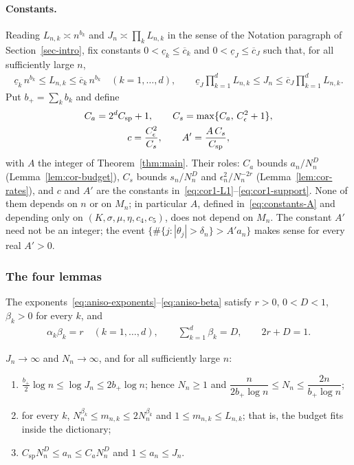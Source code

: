 \paragraph*{Constants.}
Reading $L_{n,k}\asymp n^{b_k}$ and $J_n\asymp\prod_kL_{n,k}$ in the sense of the Notation paragraph of Section~\ref{sec-intro}, fix constants $0<\underline c_k\leq\overline c_k$ and $0<\underline c_J\leq\overline c_J$ such that, for all sufficiently large $n$,
\begin{align}
\underline c_k\,n^{b_k}\leq L_{n,k}\leq\overline c_k\,n^{b_k}\quad(k=1,\ldots,d),
\qquad
\underline c_J\prod_{k=1}^dL_{n,k}\leq J_n\leq\overline c_J\prod_{k=1}^dL_{n,k}. \label{eq:cor-sizes}
\end{align}
Put $b_+=\sum_kb_k$ and define
\begin{gather}
C_a=2^dC_{\mathrm{sp}}+1,
\qquad
C_s=\max\{C_a,\,C_\epsilon^2+1\},
\notag\\
c=\frac{C_\epsilon^2}{C_s},
\qquad
A'=\frac{A\,C_s}{C_{\mathrm{sp}}}, \label{eq:cor-constants}
\end{gather}
with $A$ the integer of Theorem~\ref{thm:main}. Their roles: $C_a$ bounds $a_n/N_n^D$ (Lemma~\ref{lem:cor-budget}), $C_s$ bounds $s_n/N_n^D$ and $\epsilon_n^2/N_n^{-2r}$ (Lemma~\ref{lem:cor-rates}), and $c$ and $A'$ are the constants in~\eqref{eq:cor1-L1}--\eqref{eq:cor1-support}. None of them depends on $n$ or on $M_n$; in particular $A$, defined in~\eqref{eq:constants-A} and depending only on $(K,\sigma,\mu,\eta,c_4,c_5)$, does not depend on $M_n$. The constant $A'$ need not be an integer; the event $\{\#\{j:|\theta_j|>\delta_n\}>A'a_n\}$ makes sense for every real $A'>0$.

\subsubsection*{The four lemmas}

\begin{auxlemma}\label{lem:cor-exponents}
The exponents~\eqref{eq:aniso-exponents}--\eqref{eq:aniso-beta} satisfy $r>0$, $0<D<1$, $\beta_k>0$ for every $k$, and
\begin{align}
\alpha_k\beta_k=r\quad(k=1,\ldots,d),
\qquad
\sum_{k=1}^d\beta_k=D,
\qquad
2r+D=1. \label{eq:aniso-identities}
\end{align}
\end{auxlemma}

\begin{auxlemma}\label{lem:cor-budget}
$J_n\to\infty$ and $N_n\to\infty$, and for all sufficiently large $n$:
\begin{enumerate}[label=(\alph*),itemsep=1pt]
\item $\tfrac{b_+}2\log n\leq\log J_n\leq2b_+\log n$; hence $N_n\geq1$ and
$\dfrac{n}{2b_+\log n}\leq N_n\leq\dfrac{2n}{b_+\log n}$;
\item for every $k$, $N_n^{\beta_k}\leq m_{n,k}\leq2N_n^{\beta_k}$ and $1\leq m_{n,k}\leq L_{n,k}$; that is, the budget fits inside the dictionary;
\item $C_{\mathrm{sp}}N_n^D\leq a_n\leq C_aN_n^D$ and $1\leq a_n\leq J_n$.
\end{enumerate}
\end{auxlemma}

